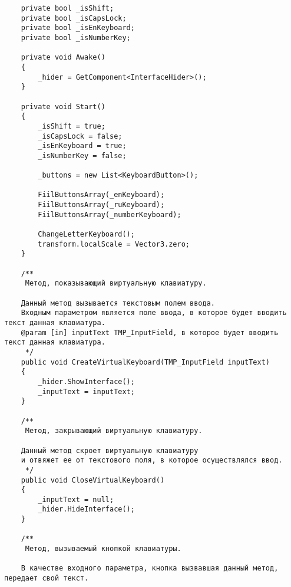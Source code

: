\begin{verbatim}
    private bool _isShift;
    private bool _isCapsLock;
    private bool _isEnKeyboard;
    private bool _isNumberKey;

    private void Awake()
    {
        _hider = GetComponent<InterfaceHider>();
    }

    private void Start()
    {
        _isShift = true;
        _isCapsLock = false;
        _isEnKeyboard = true;
        _isNumberKey = false;

        _buttons = new List<KeyboardButton>();

        FiilButtonsArray(_enKeyboard);
        FiilButtonsArray(_ruKeyboard);
        FiilButtonsArray(_numberKeyboard);

        ChangeLetterKeyboard();
        transform.localScale = Vector3.zero;
    }

    /**
     Метод, показывающий виртуальную клавиатуру.

    Данный метод вызывается текстовым полем ввода.
    Входным параметром является поле ввода, в которое будет вводить текст данная клавиатура.
    @param [in] inputText TMP_InputField, в которое будет вводить текст данная клавиатура.
     */
    public void CreateVirtualKeyboard(TMP_InputField inputText)
    {
        _hider.ShowInterface();
        _inputText = inputText;
    }

    /**
     Метод, закрывающий виртуальную клавиатуру.

    Данный метод скроет виртуальную клавиатуру 
    и отвяжет ее от текстового поля, в которое осуществлялся ввод.
     */
    public void CloseVirtualKeyboard()
    {
        _inputText = null;
        _hider.HideInterface();
    }

    /**
     Метод, вызываемый кнопкой клавиатуры. 
    
    В качестве входного параметра, кнопка вызвавшая данный метод, передает свой текст.


\end{verbatim}
